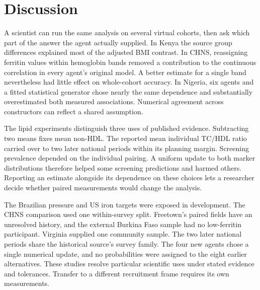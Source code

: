 \documentclass[sigconf,anonymous,review]{acmart}
\begin{document}
\section{Discussion}
A scientist can run the same analysis on several virtual cohorts, then ask which part of the answer the agent actually supplied. In Kenya the source group differences explained most of the adjusted BMI contrast. In CHNS, reassigning ferritin values within hemoglobin bands removed a contribution to the continuous correlation in every agent's original model. A better estimate for a single band nevertheless had little effect on whole-cohort accuracy. In Nigeria, six agents and a fitted statistical generator chose nearly the same dependence and substantially overestimated both measured associations. Numerical agreement across constructors can reflect a shared assumption.

The lipid experiments distinguish three uses of published evidence. Subtracting two means fixes mean non-HDL. The reported mean individual TC/HDL ratio carried over to two later national periods within its planning margin. Screening prevalence depended on the individual pairing. A uniform update to both marker distributions therefore helped some screening predictions and harmed others. Reporting an estimate alongside its dependence on these choices lets a researcher decide whether paired measurements would change the analysis.

The Brazilian pressure and US iron targets were exposed in development. The CHNS comparison used one within-survey split. Freetown's paired fields have an unresolved history, and the external Burkina Faso sample had no low-ferritin participant. Virginia supplied one community sample. The two later national periods share the historical source's survey family. The four new agents chose a single numerical update, and no probabilities were assigned to the eight earlier alternatives. These studies resolve particular scientific uses under stated evidence and tolerances. Transfer to a different recruitment frame requires its own measurements.



\appendix

\end{document}
